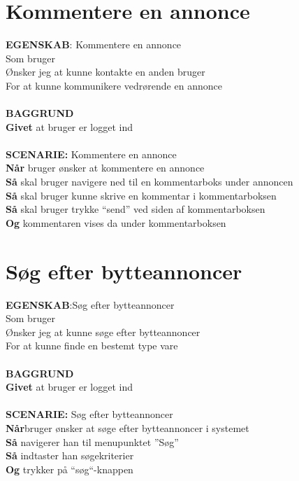 \section{Kommentere en annonce}
{\color{blue}\textbf{EGENSKAB}:} Kommentere en annonce \\
Som bruger \\
Ønsker jeg at kunne kontakte en anden bruger \\
For at kunne kommunikere vedrørende en annonce\\ \\
{\color{blue}\textbf{BAGGRUND}} \\
{\color{blue}\textbf{Givet}} at bruger er logget ind \\
\\
{\color{blue}\textbf{SCENARIE:}} Kommentere en annonce \\
{\color{blue}\textbf{Når}} bruger ønsker at kommentere en annonce
 \\
{\color{blue}\textbf{Så}} skal bruger navigere ned til en kommentarboks under annoncen \\
{\color{blue}\textbf{Så}} skal bruger kunne skrive en kommentar i kommentarboksen\\
{\color{blue}\textbf{Så}} skal bruger trykke “send” ved siden af kommentarboksen \\
{\color{blue}\textbf{Og}} kommentaren vises da under kommentarboksen


\section{Søg efter bytteannoncer}
{\color{blue}\textbf{EGENSKAB}:}Søg efter bytteannoncer \\
Som bruger \\
Ønsker jeg at kunne søge efter bytteannoncer \\
For at kunne finde en bestemt type vare\\ \\
{\color{blue}\textbf{BAGGRUND}} \\
{\color{blue}\textbf{Givet}} at bruger er logget ind \\
\\
{\color{blue}\textbf{SCENARIE:}} Søg efter bytteannoncer \\
{\color{blue}\textbf{Når}}bruger ønsker at søge efter bytteannoncer i systemet\\
{\color{blue}\textbf{Så}} navigerer han til menupunktet ”Søg” \\
{\color{blue}\textbf{Så}} indtaster han søgekriterier\\
{\color{blue}\textbf{Og}} trykker på “søg“-knappen

